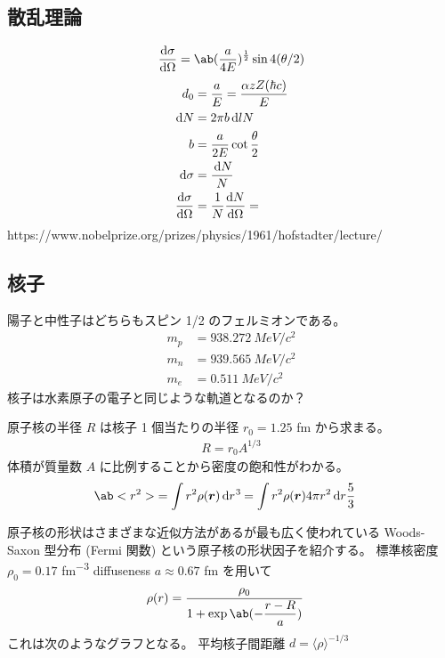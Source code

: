 \documentclass[uplatex,dvipdfmx,a4paper,11pt]{jlreq}
\newcommand{\rr}{\bm{r}}
\numberwithin{equation}{section}
\theoremstyle{definition}
\begin{document}
\subsection{散乱理論}
\begin{align}
  \diff{\sigma}{\Omega} = \ab(\frac{a}{4E})^{\frac{1}{2}}\sin4(\theta/2)
\end{align}
\begin{align}
  d_0                   & = \frac{a}{E} = \frac{\alpha z Z(\hbar c)}{E} \\
  \dl{N}                & = 2\pi b\dl{l}N                               \\
  b                     & = \frac{a}{2E}\cot\frac{\theta}{2}            \\
  \dl{\sigma}           & = \frac{\dl{N}}{N}                            \\
  \diff{\sigma}{\Omega} & = \frac{1}{N}\diff{N}{\Omega} =
\end{align}
https://www.nobelprize.org/prizes/physics/1961/hofstadter/lecture/

\subsection{核子}
陽子と中性子はどちらもスピン 1/2 のフェルミオンである。
\begin{align}
  m_p & = 938.272\ \si{MeV/c^2} \\
  m_n & = 939.565\ \si{MeV/c^2} \\
  m_e & = 0.511\ \si{MeV/c^2}
\end{align}
核子は水素原子の電子と同じような軌道となるのか？

原子核の半径 $R$ は核子 1 個当たりの半径 $r_0 = 1.25$ \si{fm} から求まる。
\begin{align}
  R = r_0A^{1/3}
\end{align}
体積が質量数 $A$ に比例することから密度の飽和性がわかる。
\begin{align}
  \ab<r^2> & = \int r^2\rho(\rr)\dl[3]{r} = \int r^2\rho(\rr)4\pi r^2\dl{r}
  \frac{5}{3}
\end{align}

原子核の形状はさまざまな近似方法があるが最も広く使われている Woods-Saxon 型分布 (Fermi 関数) という原子核の形状因子を紹介する。
標準核密度 $\rho_0 = 0.17$ \si{fm^{-3}} diffuseness $a \approx 0.67$ \si{fm} を用いて
\begin{align}
  \rho(r) & = \frac{\rho_0}{1 + \exp\ab(-\dfrac{r - R}{a})}
\end{align}
これは次のようなグラフとなる。
平均核子間距離 $d = \langle\rho\rangle^{-1/3}$
\end{document}
